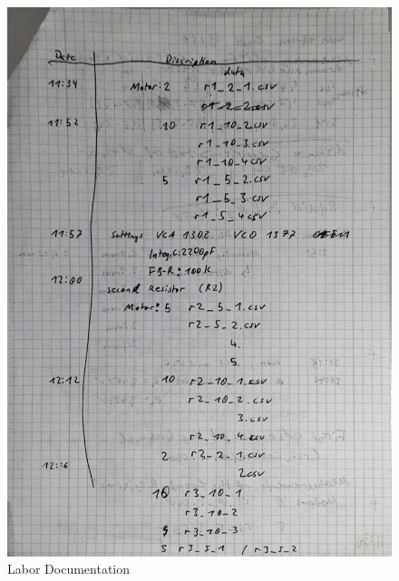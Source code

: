 \documentclass[30pt,a4paper]{article}
\begin{document}
	\begin{figure}[ht]
		\includegraphics[scale=0.3]{Bild/SQUID_(3)}
		\centering
		\caption{Labor Documentation}
	\end{figure}
\end{document}
